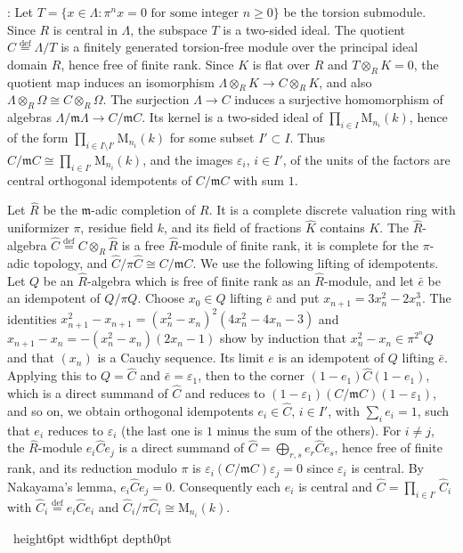 \documentclass[leqno]{article}
\newcommand{\M}{\mathrm{M}}
\renewcommand{\geq}{\ensuremath{\geqslant}}
\newcommand{\qed}{\hfill \vrule height6pt  width6pt depth0pt}
\newcommand{\ot}{\otimes}
\newcommand{\ov}{\overset}
\newcommand{\epsi}{\varepsilon}
\newenvironment{proof}[1][]{\noindent {\it Proof #1} : }{\hbox{~}\qed
\smallskip
}
\numberwithin{equation}{section}
\begin{document}
\begin{proof}
Let $T = \{x \in \Lambda : \pi^n x = 0 \text{ for some integer } n \geq 0\}$ be the torsion submodule. Since $R$ is central in $\Lambda$, the subspace $T$ is a two-sided ideal. The quotient $C \ov{\mathrm{def}}{=} \Lambda/T$ is a finitely generated torsion-free module over the principal ideal domain $R$, hence free of finite rank. Since $K$ is flat over $R$ and $T \ot_R K = 0$, the quotient map induces an isomorphism $\Lambda \ot_R K \to C \ot_R K$, and also $\Lambda \ot_R \Omega \cong C \ot_R \Omega$. The surjection $\Lambda \to C$ induces a surjective homomorphism of algebras $\Lambda/\mathfrak m\Lambda \to C/\mathfrak m C$. Its kernel is a two-sided ideal of $\prod_{i \in I} \M_{n_i}(k)$, hence of the form $\prod_{i \in I \setminus I'} \M_{n_i}(k)$ for some subset $I' \subset I$. Thus $C/\mathfrak m C \cong \prod_{i \in I'} \M_{n_i}(k)$, and the images $\epsi_i$, $i \in I'$, of the units of the factors are central orthogonal idempotents of $C/\mathfrak m C$ with sum $1$.

Let $\hat R$ be the $\mathfrak m$-adic completion of $R$. It is a complete discrete valuation ring with uniformizer $\pi$, residue field $k$, and its field of fractions $\hat K$ contains $K$. The $\hat R$-algebra $\hat C \ov{\mathrm{def}}{=} C \ot_R \hat R$ is a free $\hat R$-module of finite rank, it is complete for the $\pi$-adic topology, and $\hat C/\pi \hat C \cong C/\mathfrak m C$. We use the following lifting of idempotents. Let $Q$ be an $\hat R$-algebra which is free of finite rank as an $\hat R$-module, and let $\bar e$ be an idempotent of $Q/\pi Q$. Choose $x_0 \in Q$ lifting $\bar e$ and put $x_{n+1} = 3x_n^2 - 2x_n^3$. The identities $x_{n+1}^2 - x_{n+1} = (x_n^2 - x_n)^2(4x_n^2 - 4x_n - 3)$ and $x_{n+1} - x_n = -(x_n^2 - x_n)(2x_n - 1)$ show by induction that $x_n^2 - x_n \in \pi^{2^n} Q$ and that $(x_n)$ is a Cauchy sequence. Its limit $e$ is an idempotent of $Q$ lifting $\bar e$. Applying this to $Q = \hat C$ and $\bar e = \epsi_1$, then to the corner $(1-e_1)\hat C(1-e_1)$, which is a direct summand of $\hat C$ and reduces to $(1-\epsi_1)(C/\mathfrak m C)(1-\epsi_1)$, and so on, we obtain orthogonal idempotents $e_i \in \hat C$, $i \in I'$, with $\sum_i e_i = 1$, such that $e_i$ reduces to $\epsi_i$ (the last one is $1$ minus the sum of the others). For $i \neq j$, the $\hat R$-module $e_i \hat C e_j$ is a direct summand of $\hat C = \bigoplus_{r,s} e_r \hat C e_s$, hence free of finite rank, and its reduction modulo $\pi$ is $\epsi_i (C/\mathfrak m C) \epsi_j = 0$ since $\epsi_i$ is central. By Nakayama's lemma, $e_i \hat C e_j = 0$. Consequently each $e_i$ is central and $\hat C = \prod_{i \in I'} \hat C_i$ with $\hat C_i \ov{\mathrm{def}}{=} e_i \hat C e_i$ and $\hat C_i/\pi \hat C_i \cong \M_{n_i}(k)$.


\end{proof}
\end{document}
